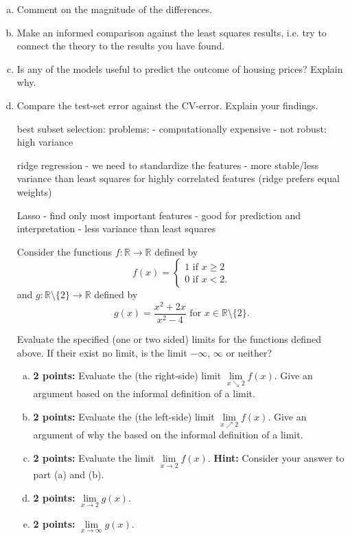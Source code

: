 \documentclass[11pt,a4paper]{article}
\begin{document}
\begin{enumerate}[(a)]

\item Comment on the magnitude of the differences.
\item Make an informed comparison against the least squares results, i.e. try to connect the theory to the results you have found.
\item Is any of the models useful to predict the outcome of housing prices? Explain why.
\item Compare the test-set error against the CV-error. Explain your findings.

best subset selection:
problems:
- computationally expensive
- not robust: high variance

ridge regression
- we need to standardize the features
- more stable/less variance than least squares for highly correlated features (ridge prefers equal weights)

Lasso
- find only most important features
- good for prediction and interpretation
- less variance than least squares




Consider the functions $f:\mathbb{R} \to \mathbb{R}$ defined by 
\begin{equation*}
f(x) = \begin{cases}
1 \text{ if } x \geq 2 \\
0 \text{ if } x < 2.
\end{cases}
\end{equation*}
and $g:\mathbb{R} \setminus \{ 2 \} \to \mathbb{R}$ defined by 
\begin{equation*}
g(x) = \frac{x^2 + 2x}{x^2 - 4} \text{ for } x \in \mathbb{R} \setminus \{ 2 \}.
\end{equation*}

Evaluate the specified (one or two sided) limits for the functions defined above. If their exist no limit, is the limit $-\infty$, $\infty$ or neither?


\begin{enumerate}[a)]
	\item \textbf{2 points:} Evaluate the (the right-side) limit $\underset{x \searrow 2}{\lim} f(x)$. Give an argument based on the informal definition of a limit.
	\item \textbf{2 points:} Evaluate the (the left-side) limit $\underset{x \nearrow 2}{\lim} f(x)$. Give an argument of why the based on the informal definition of a limit.
	\item \textbf{2 points:} Evaluate the limit $\underset{x \to 2}{\lim} f(x)$. \textbf{Hint:} Consider your answer to part (a) and (b).
	\item \textbf{2 points:}  $\underset{x \to 2}{\lim} g(x)$.
	\item \textbf{2 points:} $\underset{x \to \infty}{\lim} g(x)$.
\end{enumerate}


\end{enumerate}
\end{document}
